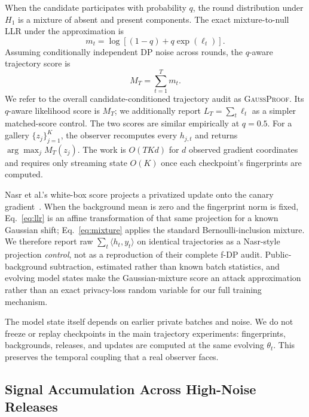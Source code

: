 \documentclass[conference]{IEEEtran}
\newcommand{\method}{\textsc{GaussProof}}
\begin{document}
When the candidate participates with probability $q$, the round distribution under $H_1$ is a mixture of absent and present components. The exact mixture-to-null LLR under the approximation is
\begin{equation}
m_t=\log\left[(1-q)+q\exp(\ell_t)\right].
\label{eq:mixture}
\end{equation}
Assuming conditionally independent DP noise across rounds, the $q$-aware trajectory score is
\begin{equation}
M_T=\sum_{t=1}^{T}m_t.
\label{eq:trajectory}
\end{equation}
We refer to the overall candidate-conditioned trajectory audit as \method. Its $q$-aware likelihood score is $M_T$; we additionally report $L_T=\sum_t\ell_t$ as a simpler matched-score control. The two scores are similar empirically at $q=0.5$. For a gallery $\{z_j\}_{j=1}^K$, the observer recomputes every $h_{j,t}$ and returns $\arg\max_j M_T(z_j)$. The work is $O(TKd)$ for $d$ observed gradient coordinates and requires only streaming state $O(K)$ once each checkpoint's fingerprints are computed.

Nasr et al.'s white-box score projects a privatized update onto the canary gradient~\cite{nasr2023tight}. When the background mean is zero and the fingerprint norm is fixed, Eq.~\ref{eq:llr} is an affine transformation of that same projection for a known Gaussian shift; Eq.~\ref{eq:mixture} applies the standard Bernoulli-inclusion mixture. We therefore report raw $\sum_t\langle h_t,y_t\rangle$ on identical trajectories as a Nasr-style projection \emph{control}, not as a reproduction of their complete f-DP audit. Public-background subtraction, estimated rather than known batch statistics, and evolving model states make the Gaussian-mixture score an attack approximation rather than an exact privacy-loss random variable for our full training mechanism.

The model state itself depends on earlier private batches and noise. We do not freeze or replay checkpoints in the main trajectory experiments: fingerprints, backgrounds, releases, and updates are computed at the same evolving $\theta_t$. This preserves the temporal coupling that a real observer faces.

\subsection{Signal Accumulation Across High-Noise Releases}
\end{document}
